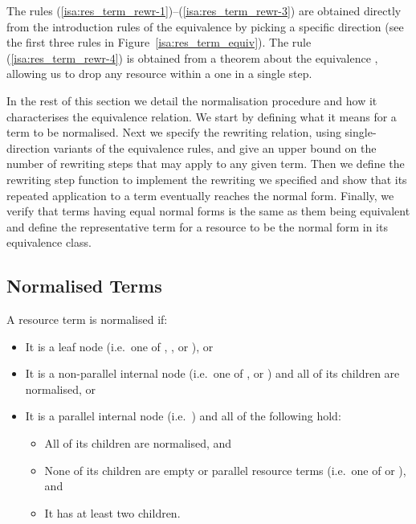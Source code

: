 \documentclass[class=smolathesis,crop=false]{standalone}
\begin{document}
The rules (\ref{isa:res_term_rewr-1})--(\ref{isa:res_term_rewr-3}) are obtained directly from the introduction rules of the equivalence \isa{\isasymsim} by picking a specific direction (see the first three rules in Figure~\ref{isa:res_term_equiv}).
The rule (\ref{isa:res_term_rewr-4}) is obtained from a theorem about the equivalence \isa{\isasymsim}, allowing us to drop any  resource within a  one in a single step.

In the rest of this section we detail the normalisation procedure and how it characterises the equivalence relation.
We start by defining what it means for a term to be normalised.
Next we specify the rewriting relation, using single-direction variants of the equivalence rules, and give an upper bound on the number of rewriting steps that may apply to any given term.
Then we define the rewriting step function to implement the rewriting we specified and show that its repeated application to a term eventually reaches the normal form.
Finally, we verify that terms having equal normal forms is the same as them being equivalent and define the representative term for a resource to be the normal form in its equivalence class.

\subsection{Normalised Terms}
\label{sec:res/rewr/normalised}

A resource term is normalised if:
\begin{itemize}
  \item It is a leaf node (i.e.\ one of , ,  or ), or
  \item It is a non-parallel internal node (i.e.\ one of ,  or ) and all of its children are normalised, or
  \item It is a parallel internal node (i.e.\ ) and all of the following hold:
    \begin{itemize}
      \item All of its children are normalised, and
      \item None of its children are empty or parallel resource terms (i.e.\ one of  or ), and
      \item It has at least two children.
    \end{itemize}
\end{itemize}
\end{document}
